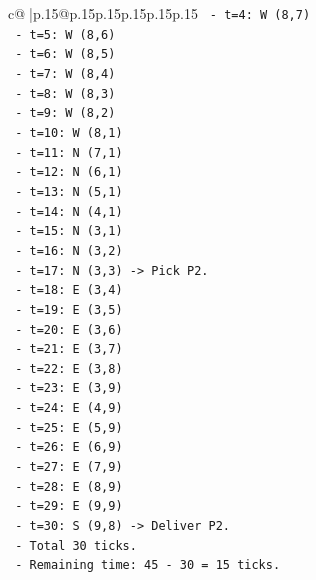 \documentclass{article}
\begin{document}
{\begin{supertabular}{c@{$\;$}|p{.15\linewidth}@{}p{.15\linewidth}p{.15\linewidth}p{.15\linewidth}p{.15\linewidth}p{.15\linewidth}}
{{{\texttt{                {-}   t=4: W (8,7)} \\
\texttt{                {-}   t=5: W (8,6)} \\
\texttt{                {-}   t=6: W (8,5)} \\
\texttt{                {-}   t=7: W (8,4)} \\
\texttt{                {-}   t=8: W (8,3)} \\
\texttt{                {-}   t=9: W (8,2)} \\
\texttt{                {-}   t=10: W (8,1)} \\
\texttt{                {-}   t=11: N (7,1)} \\
\texttt{                {-}   t=12: N (6,1)} \\
\texttt{                {-}   t=13: N (5,1)} \\
\texttt{                {-}   t=14: N (4,1)} \\
\texttt{                {-}   t=15: N (3,1)} \\
\texttt{                {-}   t=16: N (3,2)} \\
\texttt{                {-}   t=17: N (3,3) {-}> Pick P2.} \\
\texttt{                {-}   t=18: E (3,4)} \\
\texttt{                {-}   t=19: E (3,5)} \\
\texttt{                {-}   t=20: E (3,6)} \\
\texttt{                {-}   t=21: E (3,7)} \\
\texttt{                {-}   t=22: E (3,8)} \\
\texttt{                {-}   t=23: E (3,9)} \\
\texttt{                {-}   t=24: E (4,9)} \\
\texttt{                {-}   t=25: E (5,9)} \\
\texttt{                {-}   t=26: E (6,9)} \\
\texttt{                {-}   t=27: E (7,9)} \\
\texttt{                {-}   t=28: E (8,9)} \\
\texttt{                {-}   t=29: E (9,9)} \\
\texttt{                {-}   t=30: S (9,8) {-}> Deliver P2.} \\
\texttt{                {-}   Total 30 ticks.} \\
\texttt{                {-}   Remaining time: 45 {-} 30 = 15 ticks.} \\
}}}
\end{supertabular}}
\end{document}
